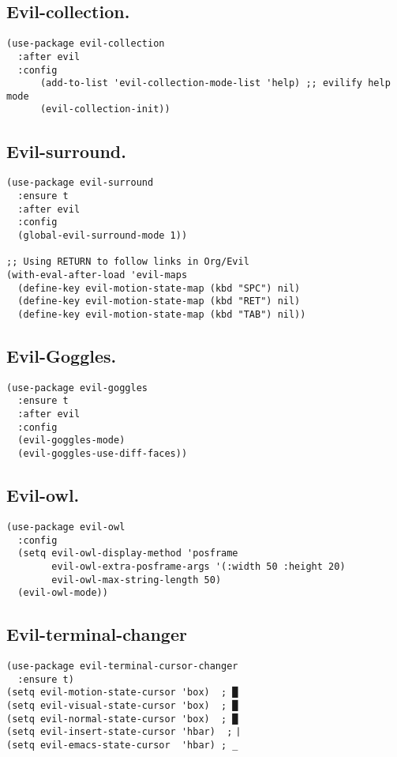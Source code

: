 \documentclass[11pt]{article}
\begin{document}
\subsection{Evil-collection.}
\label{sec:orgd12fb02}
\begin{verbatim}
(use-package evil-collection
  :after evil
  :config
      (add-to-list 'evil-collection-mode-list 'help) ;; evilify help mode
      (evil-collection-init))
\end{verbatim}
\subsection{Evil-surround.}
\label{sec:org7566764}
\begin{verbatim}
(use-package evil-surround
  :ensure t
  :after evil
  :config
  (global-evil-surround-mode 1))

;; Using RETURN to follow links in Org/Evil 
(with-eval-after-load 'evil-maps
  (define-key evil-motion-state-map (kbd "SPC") nil)
  (define-key evil-motion-state-map (kbd "RET") nil)
  (define-key evil-motion-state-map (kbd "TAB") nil))
\end{verbatim}
\subsection{Evil-Goggles.}
\label{sec:org0483b87}
\begin{verbatim}
(use-package evil-goggles
  :ensure t
  :after evil
  :config
  (evil-goggles-mode)
  (evil-goggles-use-diff-faces))
\end{verbatim}
\subsection{Evil-owl.}
\label{sec:org46ae9ba}
\begin{verbatim}
(use-package evil-owl
  :config
  (setq evil-owl-display-method 'posframe
        evil-owl-extra-posframe-args '(:width 50 :height 20)
        evil-owl-max-string-length 50)
  (evil-owl-mode))
\end{verbatim}
\subsection{Evil-terminal-changer}
\label{sec:orgc136753}
\begin{verbatim}
(use-package evil-terminal-cursor-changer
  :ensure t)
(setq evil-motion-state-cursor 'box)  ; █
(setq evil-visual-state-cursor 'box)  ; █
(setq evil-normal-state-cursor 'box)  ; █
(setq evil-insert-state-cursor 'hbar)  ; ⎸
(setq evil-emacs-state-cursor  'hbar) ; _
\end{verbatim}
\end{document}
